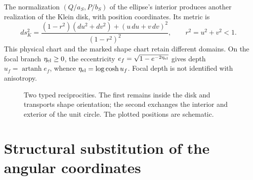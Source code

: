 The normalization \((Q/a_S,P/b_S)\) of the ellipse's interior produces another realization of the Klein disk, with position coordinates. Its metric is
\[
 ds_K^2=\frac{(1-r^2)(du^2+dv^2)+(u\,du+v\,dv)^2}{(1-r^2)^2},
 \qquad r^2=u^2+v^2<1.
\]
This physical chart and the marked shape chart retain different domains. On the focal branch \(\eta_{\rm el}\ge0\), the eccentricity \(e_f=\sqrt{1-e^{-2\eta_{\rm el}}}\) gives depth \(u_f=\operatorname{artanh}e_f\), whence \(\eta_{\rm el}=\log\cosh u_f\). Focal depth is not identified with anisotropy.

\begin{figure}[htbp]
\centering
{}
\caption{Two typed reciprocities. The first remains inside the disk and transports shape orientation; the second exchanges the interior and exterior of the unit circle. The plotted positions are schematic.}
\label{x_reciprocidad:fig:rec-dos-cartas}
\end{figure}

\section{Structural substitution of the angular coordinates}
\label{x_reciprocidad:rec:sustitucion}

